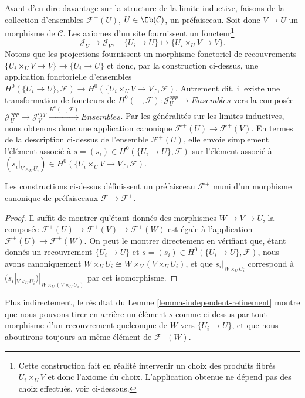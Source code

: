 \medskip\noindent
Avant d’en dire davantage sur la structure de la limite inductive, faisons
de la collection d’ensembles
$\mathcal{F}^{+}(U)$, $U \in \Ob(\mathcal{C})$,
un préfaisceau. Soit donc $V \to U$ un morphisme de $\mathcal{C}$.
Les axiomes d’un site fournissent un foncteur\footnote{Cette construction
fait en réalité intervenir un choix des produits fibrés $U_i \times_U V$
et donc l’axiome du choix. L’application obtenue ne dépend pas
des choix effectués, voir ci-dessous.}
$$
\mathcal{J}_U
\longrightarrow
\mathcal{J}_V, \quad
\{U_i \to U\}
\longmapsto
\{U_i \times_U V \to V\}.
$$
Notons que les projections fournissent un
morphisme fonctoriel de recouvrements $\{U_i \times_U V \to V\} \to \{U_i \to U\}$
et donc, par la construction ci-dessus, une application fonctorielle d’ensembles
$H^0(\{U_i \to U\}, \mathcal{F}) \to
H^0(\{U_i \times_U V \to V\}, \mathcal{F})$.
Autrement dit, il existe une transformation de foncteurs
de $H^0(-, \mathcal{F}) : \mathcal{J}_U^{opp} \to \textit{Ensembles}$
vers la composée
$\mathcal{J}_U^{opp} \to \mathcal{J}_V^{opp}
\xrightarrow{H^0(-, \mathcal{F})} \textit{Ensembles}$. Par les
généralités sur les limites inductives, nous obtenons donc une application canonique
$\mathcal{F}^+(U) \to \mathcal{F}^+(V)$. En termes de la description
ci-dessus de l’ensemble $\mathcal{F}^+(U)$, elle envoie simplement l’élément
associé à $s = (s_i) \in H^0(\{U_i \to U\}, \mathcal{F})$ sur l’élément
associé à $(s_i|_{V \times_U U_i})
\in H^0(\{U_i \times_U V \to V\}, \mathcal{F})$.

\begin{lemma}
\label{lemma-plus-presheaf}
Les constructions ci-dessus définissent un préfaisceau
$\mathcal{F}^+$ muni d’un morphisme canonique
de préfaisceaux $\mathcal{F} \to \mathcal{F}^+$.
\end{lemma}

\begin{proof}
Il suffit de montrer qu’étant donnés des morphismes
$W \to V \to U$, la composée $\mathcal{F}^+(U)
\to \mathcal{F}^+(V) \to \mathcal{F}^+(W)$
est égale à l’application $\mathcal{F}^+(U) \to \mathcal{F}^+(W)$.
On peut le montrer directement en vérifiant que, étant donnés
un recouvrement $\{U_i \to U\}$ et
$s = (s_i) \in H^0(\{U_i \to U\}, \mathcal{F})$,
nous avons canoniquement
$W \times_U U_i \cong W \times_V (V \times_U U_i)$,
et que
$s_i|_{W \times_U U_i}$
correspond à
$(s_i|_{V \times_U U_i})|_{W \times_V (V \times_U U_i)}$
par cet isomorphisme.
\end{proof}

\noindent
Plus indirectement, le résultat du
Lemme \ref{lemma-independent-refinement} montre que
nous pouvons tirer en arrière un élément $s$ comme ci-dessus par tout morphisme
d’un recouvrement quelconque de $W$ vers $\{U_i \to U\}$,
et que nous aboutirons toujours au même élément de
$\mathcal{F}^+(W)$.

